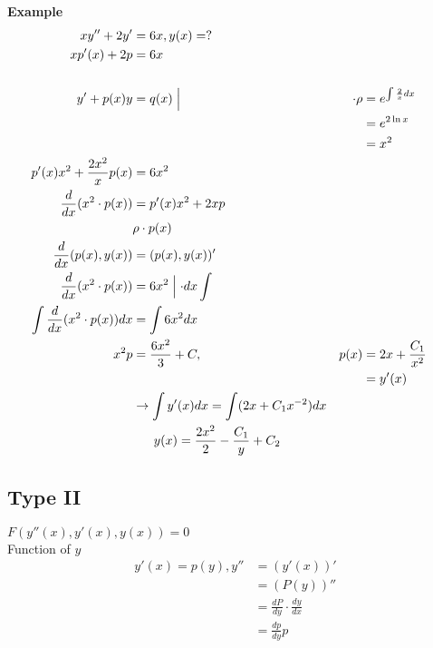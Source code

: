 \documentclass[10pt, letterpaper]{article}
\begin{document}
\textbf{Example}\\
\begin{align*}
xy''+2y' &= 6x, y(x)=?\\
xp'(x)+2p &= 6x\\
\\
y'+p(x)y &= q(x) \Bigm \lvert &\cdot \rho &= e^{\int \limits \frac{2}{x} dx}\\
& & &= e^{2 \ln x}\\
& & &= x^2\\
p'(x)x^2 + \frac{2x^2}{x}p(x) &= 6x^2\\
\frac{d}{dx} (x^2 \cdot p(x)) &= p'(x)x^2 +2xp\\
& \rho \cdot p(x)\\
\frac{d}{dx} (p(x), y(x)) &= (p(x), y(x))'\\
\frac{d}{dx} (x^2 \cdot p(x)) &= 6x^2 \Bigm \lvert \cdot dx \int \limits\\
\int \limits \frac{d}{dx} (x^2 \cdot p(x)) dx &= \int \limits 6x^2 dx\\
x^2p &= \frac{6x^2}{3} +C,& p(x) &= 2x + \frac{C_1}{x^2}\\
& & &= y'(x)\\
&\rightarrow \int \limits y'(x) dx = \int \limits (2x+C_1x^{-2})dx\\
&~~~~~ y(x) = \frac{2x^2}{2} - \frac{C_1}{y} + C_2
\end{align*}

\subsection{Type II} $F(y''(x), y'(x), y(x)) = 0$\\
Function of $y$
\begin{align*}
y'(x) = p(y), y'' &= (y'(x))'\\
&= (P(y))''\\
&= \frac{dP}{dy} \cdot \frac{dy}{dx}\\
&= \frac{dp}{dy} p
\end{align*}
\end{document}
